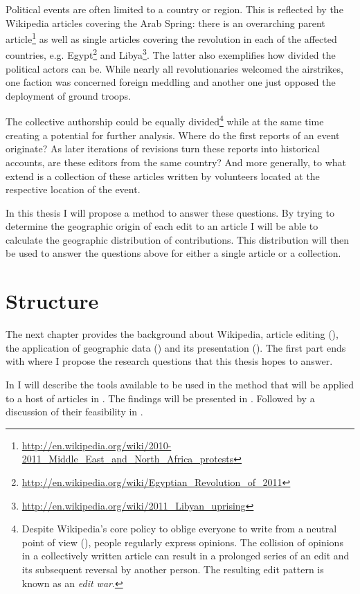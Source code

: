 Political events are often limited to a country or region. 
This is reflected by the Wikipedia articles covering the Arab Spring: there is an overarching parent article\footnote{\url{http://en.wikipedia.org/wiki/2010-2011_Middle_East_and_North_Africa_protests}} as well as single articles covering the revolution in each of the affected countries, e.g. Egypt\footnote{\url{http://en.wikipedia.org/wiki/Egyptian_Revolution_of_2011}} and Libya\footnote{\url{http://en.wikipedia.org/wiki/2011_Libyan_uprising}}.
The latter also exemplifies how divided the political actors can be.
While nearly all revolutionaries welcomed the airstrikes, one faction was concerned foreign meddling and another one just opposed the deployment of ground troops.\cite{econ18290470}

The collective authorship could be equally divided\footnote{Despite Wikipedia's core policy to oblige everyone to write from a neutral point of view (), people regularly express opinions. The collision of opinions in a collectively written article can result in a prolonged series of an edit and its subsequent reversal by another person. The resulting edit pattern is known as an \emph{edit war}.\cite{suh2007us}} while at the same time creating a potential for further analysis.
Where do the first reports of an event originate?
As later iterations of revisions turn these reports into historical accounts, are these editors from the same country?
And more generally, to what extend is a collection of these articles written by volunteers located at the respective location of the event.

In this thesis I will propose a method to answer these questions.
By trying to determine the geographic origin of each edit to an article I will be able to calculate the geographic distribution of contributions.
This distribution will then be used to answer the questions above for either a single article or a collection.


\section{Structure}


The next chapter  provides the background about Wikipedia, article editing (), the application of geographic data () and its presentation ().
The first part ends with  where I propose the research questions that this thesis hopes to answer.

In  I will describe the tools available to be used in the method that will be applied to a host of articles in .
The findings will be presented in .
Followed by a discussion of their feasibility in .